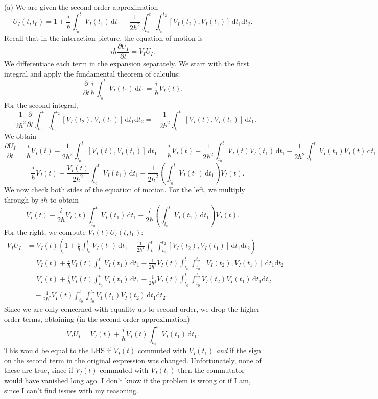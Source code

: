 \documentclass[11pt, letterpaper]{article}
\theoremstyle{plain}
\begin{document}
(a) We are given the second order approximation
\[
	U_I(t,t_0)=1+\frac{i}{\hbar} \int_{t_0}^{t} V_I(t_1) \,\mathrm{d} t_1-\frac{1}{2\hbar^2} \int_{t_0}^{t}\int_{t_0}^{t_2} [V_I(t_2),V_I(t_1)] \,\mathrm{d} t_1 \mathrm{d} t_2
.\]
Recall that in the interaction picture, the equation of motion is
\[
	i\hbar \frac{\partial U_I}{\partial t} =V_IU_I
.\]
We differentiate each term in the expansion separately. We start with the first integral and apply the fundamental theorem of calculus:
\[
	\frac{\partial }{\partial t} \frac{i}{\hbar} \int_{t_0}^{t} V_I(t_1) \,\mathrm{d} t_1=\frac{i}{\hbar} V_I(t)
.\]
For the second integral,
\[
	-\frac{1}{2\hbar^2} \frac{\partial }{\partial t} \int_{t_0}^{t}\int_{t_0}^{t_2} \left[ V_I(t_2),V_I(t_1) \right]  \,\mathrm{d} t_1 \mathrm{d} t_2=-\frac{1}{2\hbar^2} \int_{t_0}^{t} \left[ V_I(t),V_I(t_1) \right]  \,\mathrm{d} t_1
.\]
We obtain
\[
	\frac{\partial U_I}{\partial t} =\frac{i}{\hbar} V_I(t)-\frac{1}{2\hbar^2} \int_{t_0}^{t} [V_I(t),V_I(t_1)] \,\mathrm{d} t_1=\frac{i}{\hbar} V_I(t)-\frac{1}{2\hbar^2} \int_{t_0}^{t} V_I(t)V_I(t_1) \,\mathrm{d} t_1-\frac{1}{2\hbar^2} \int_{t_0}^{t} V_I(t_1)V_I(t) \,\mathrm{d} t_1
\]
\[
	=\frac{i}{\hbar} V_I(t)-\frac{V_I(t)}{2\hbar^2} \int_{t_0}^{t} V_I(t_1) \,\mathrm{d} t_1 - \frac{1}{2\hbar^2} \left( \int_{t_0}^{t} V_I(t_1) \,\mathrm{d} t_1 \right) V_I(t)
.\]
We now check both sides of the equation of motion. For the left, we multiply through by $i\hbar$ to obtain
\[
	V_I(t)-\frac{i}{2\hbar} V_I(t)\int_{t_0}^{t} V_I(t_1) \,\mathrm{d} t_1-\frac{i}{2\hbar} \left( \int_{t_0}^{t} V_I(t_1) \,\mathrm{d} t_1 \right) V_I(t)
.\]
For the right, we compute $V_I(t)U_I(t,t_0)$:
\begin{align*}
	V_IU_I&=V_I(t)\left( 1+\frac{i}{\hbar} \int_{t_0}^{t} V_I(t_1) \,\mathrm{d} t_1-\frac{1}{2\hbar^2} \int_{t_0}^{t}\int_{t_0}^{t_2} \left[ V_I(t_2),V_I(t_1) \right]  \,\mathrm{d} t_1 \mathrm{d} t_2 \right)\\
	      &=V_I(t)+\frac{i}{\hbar}V_I(t)\int_{t_0}^{t} V_I(t_1) \,\mathrm{d} t_1-\frac{1}{2\hbar^2} V_I(t) \int_{t_0}^{t}\int_{t_0}^{t_2} \left[ V_I(t_2),V_I(t_1) \right]  \,\mathrm{d} t_1 \mathrm{d} t_2 \\
	      &=V_I(t)+\frac{i}{\hbar} V_I(t)\int_{t_0}^{t} V_I(t_1) \,\mathrm{d} t_1 - \frac{1}{2\hbar^2} V_I(t)\int_{t_0}^{t}\int_{t_0}^{t_2} V_I(t_2)V_I(t_1) \,\mathrm{d} t_1 \mathrm{d} t_2\\
	      &\quad-\frac{1}{2\hbar^2} V_I(t)\int_{t_0}^{t}\int_{t_0}^{t_2} V_I(t_1)V_I(t_2) \,\mathrm{d} t_1 \mathrm{d} t_2
.\end{align*}
Since we are only concerned with equality up to second order, we drop the higher order terms, obtaining (in the second order approximation)
\[
	V_I U_I = V_I(t)+\frac{i}{\hbar}V_I(t) \int_{t_0}^{t} V_I(t_1) \,\mathrm{d} t_1
.\]
This would be equal to the LHS if $V_I(t)$ commuted with $V_I(t_1)$ \emph{and} if the sign on the second term in the original expression was changed. Unfortunately, none of these are true, since if $V_I(t)$ commuted with $V_I(t_1)$ then the commutator would have vanished long ago. I don't know if the problem is wrong or if I am, since I can't find issues with my reasoning.
\end{document}
